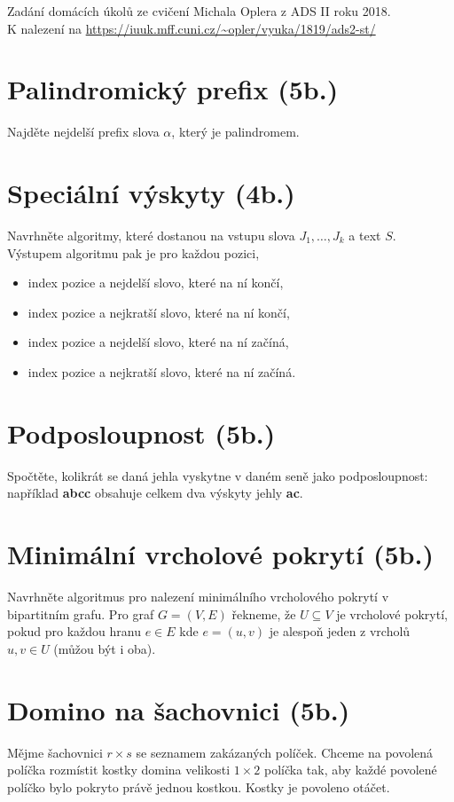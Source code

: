 \documentclass{scrartcl}
\begin{document}
Zadání domácích úkolů ze cvičení Michala Oplera z ADS II roku 2018. \\
K nalezení na \url{https://iuuk.mff.cuni.cz/~opler/vyuka/1819/ads2-st/}
\section{Palindromický prefix (5b.)}
Najděte nejdelší prefix slova $\alpha$, který je palindromem.

\section{Speciální výskyty (4b.)}
Navrhněte algoritmy, které dostanou na vstupu slova $J_{1},\dots,J_{k}$ a text $S$. Výstupem algoritmu pak je pro každou pozici,
\begin{itemize}
    \item index pozice a nejdelší slovo, které na ní končí,
    \item index pozice a nejkratší slovo, které na ní končí,
    \item index pozice a nejdelší slovo, které na ní začíná,
    \item index pozice a nejkratší slovo, které na ní začíná.
\end{itemize}

\section{Podposloupnost (5b.)}
Spočtěte, kolikrát se daná jehla vyskytne v daném seně jako podposloupnost: například \textbf{abcc} obsahuje celkem dva výskyty jehly \textbf{ac}.

\section{Minimální vrcholové pokrytí (5b.)}
Navrhněte algoritmus pro nalezení minimálního vrcholového pokrytí v bipartitním grafu. Pro graf $G = (V,E)$ řekneme, že $U \subseteq V$ je vrcholové pokrytí, pokud pro každou hranu $e \in E$ kde $e = (u,v)$ je alespoň jeden z vrcholů $u,v \in U$ (můžou být i oba).

\section{Domino na šachovnici (5b.)}
Mějme šachovnici $r \times s$ se seznamem zakázaných políček. Chceme na povolená políčka rozmístit kostky domina velikosti $1 \times 2$ políčka tak, aby každé povolené políčko bylo pokryto právě jednou kostkou. Kostky je povoleno otáčet.
\end{document}
